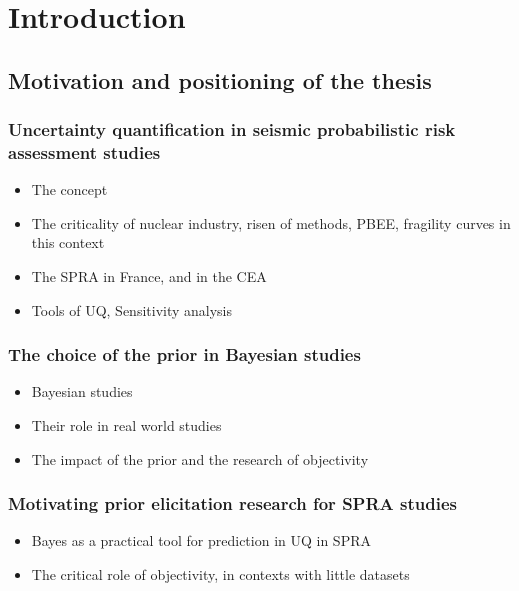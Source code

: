 

\chapter{Introduction}




\section{Motivation and positioning of the thesis}

\subsection{Uncertainty quantification in seismic probabilistic risk assessment studies}

\begin{itemize}
    \item The concept
    \item The criticality of nuclear industry, risen of methods, PBEE, fragility curves in this context
    \item The SPRA in France, and in the CEA \cite{roger_seisme_2020}
    \item Tools of UQ, Sensitivity analysis
\end{itemize}


\subsection{The choice of the prior in Bayesian studies}

\begin{itemize}
    \item Bayesian studies
    \item Their role in real world studies
    \item The impact of the prior and the research of objectivity
\end{itemize}


\subsection{Motivating prior elicitation research for SPRA studies}

\begin{itemize}
    \item Bayes as a practical tool for prediction in UQ in SPRA
    \item The critical role of objectivity, in contexts with little datasets
\end{itemize}



